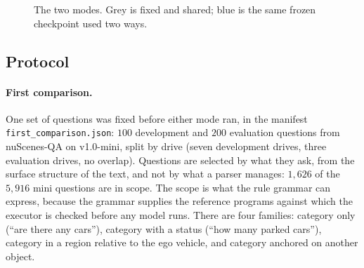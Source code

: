 \documentclass[11pt,a4paper]{article}
\newcommand{\code}[1]{\texttt{\small #1}}
\begin{document}
\begin{figure}[t]
\centering
{}
\caption{The two modes. Grey is fixed and shared; blue is the same frozen
checkpoint used two ways.}
\label{fig:pipeline}
\end{figure}

\subsection{Protocol}
\label{sec:protocol}

\paragraph{First comparison.} One set of questions was fixed before either
mode ran, in the manifest \code{first\_comparison.json}: $100$ development
and $200$ evaluation questions from nuScenes-QA on v1.0-mini, split by drive (seven
development drives, three evaluation drives, no overlap). Questions are
selected by what they ask, from the surface structure of the text, and not by
what a parser manages: $1{,}626$ of the $5{,}916$ mini questions are in
scope. The scope is what the rule grammar can express, because the grammar
supplies the reference programs against which the executor is checked before
any model runs. There are four families: category only (``are there any
cars''), category with a status (``how many parked cars''), category in a
region relative to the ego vehicle, and category anchored on another object.
\end{document}

